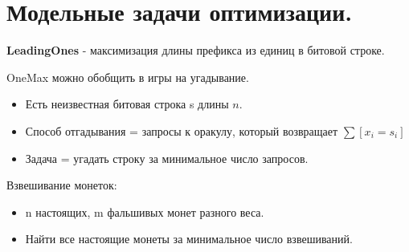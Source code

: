 \section{Модельные задачи оптимизации.}


\textbf{LeadingOnes} - максимизация длины префикса из единиц в
битовой строке.

OneMax можно обобщить в игры на угадывание.
\begin{itemize}
    \item Есть неизвестная битовая строка s длины $n$.
    \item Способ отгадывания = запросы к оракулу, который возвращает $\sum [x_i = s_i]$
    \item Задача = угадать строку за минимальное число запросов.
\end{itemize}

Взвешивание монеток:
\begin{itemize}
    \item n настоящих, m фальшивых монет разного веса.
    \item Найти все настоящие монеты за минимальное число взвешиваний.
\end{itemize}
